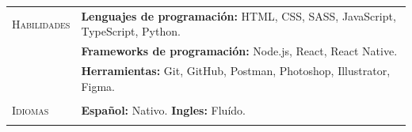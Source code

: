 \documentclass[12pt]{article}
\begin{document}
\begin{tabular}[t]{@{}p{1.15in} @{}p{5.35in}}
   {\scshape Habilidades}
   &
   \textbf{Lenguajes de programación: }  HTML, CSS, SASS, JavaScript, TypeScript, Python.%
   \vspace{0.7\baselineskip}
   \\
   &
   \textbf{Frameworks de programación: }  Node.js, React, React Native.%
   \vspace{0.7\baselineskip}
   \\
   &
   \textbf{Herramientas: }  Git, GitHub, Postman, Photoshop, Illustrator, Figma.%
   \\ 
   &
   \vspace{.3\baselineskip}
   {\noindent\hspace{-50mm}\hrulefill}
   \vspace{.7\baselineskip}
   \\

   {\scshape Idiomas}
   &
   \textbf{Español: }  Nativo. \hspace{3cm} \textbf{Ingles: }  Fluído.
   \\
   &
   \vspace{.3\baselineskip}
   {\noindent\hspace{-50mm}\hrulefill}
   \vspace{.7\baselineskip}
   \\
   

\end{tabular}
\end{document}
